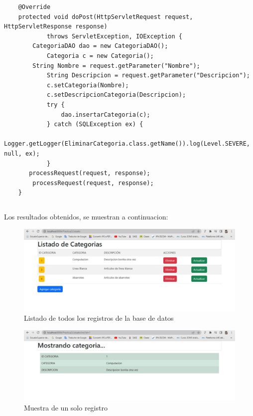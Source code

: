 \documentclass[10pt,a4paper]{article}
\begin{document}
\begin{lstlisting}
    @Override
    protected void doPost(HttpServletRequest request, HttpServletResponse response)
            throws ServletException, IOException {
        CategoriaDAO dao = new CategoriaDAO();
            Categoria c = new Categoria();
        String Nombre = request.getParameter("Nombre");
            String Descripcion = request.getParameter("Descripcion");
            c.setCategoria(Nombre);
            c.setDescripcionCategoria(Descripcion);
            try {
                dao.insertarCategoria(c);
            } catch (SQLException ex) {
                Logger.getLogger(EliminarCategoria.class.getName()).log(Level.SEVERE, null, ex);
            }
       processRequest(request, response);
        processRequest(request, response);
    }
\end{lstlisting} \hfill


\subsection{\color{colorESCOM}{Resultados}}
\normalsize{
Los resultados obtenidos, se muestran a continuacion:
}
\begin{figure}[H]
	\includegraphics[scale=.54]{Imagenes/c1.jpg}
	\centering  
	\caption{Listado de todos los registros de la base de datos}
\end{figure} \hfill 

\begin{figure}[H]
	\includegraphics[scale=.54]{Imagenes/mostrarUno.jpg}
	\centering  
	\caption{Muestra de un solo registro}
\end{figure} \hfill 
\end{document}

